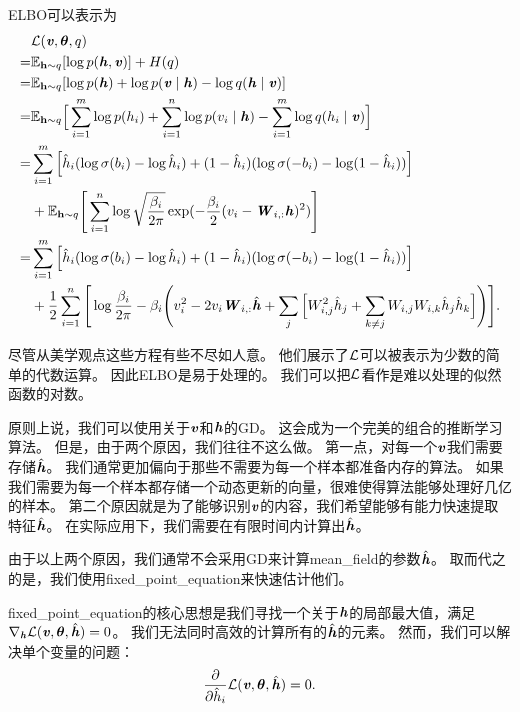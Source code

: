 \gls{ELBO}可以表示为
\begin{align}
\label{eqn:1936}
& \mathcal{L}(\boldsymbol{\mathit{v}},\boldsymbol{\theta},q)\\
 = & \mathbb{E}_{\mathbf{h}\sim q}[\log p(\boldsymbol{\mathit{h}},\boldsymbol{\mathit{v}})] + H(q)\\
 = & \mathbb{E}_{\mathbf{h}\sim q}[\log p(\boldsymbol{\mathit{h}}) + \log p(\boldsymbol{\mathit{v}}\mid\boldsymbol{\mathit{h}}) - \log q(\boldsymbol{\mathit{h}}\mid\boldsymbol{\mathit{v}})]\\
= & \mathbb{E}_{\mathbf{h}\sim q}\Big[\sum_{i=1}^{m}\log p(h_i) + \sum_{i=1}^{n} \log p(v_i\mid\boldsymbol{\mathit{h}}) - \sum_{i=1}^{m}\log q(h_i\mid\boldsymbol{\mathit{v}})\Big]\\
= &  \sum_{i=1}^{m}\Big[\hat{h}_i(\log \sigma(b_i) - \log \hat{h}_i) + (1 - \hat{h}_i)(\log \sigma(-b_i) - \log (1-\hat{h}_i))\Big] \\
& +  \mathbb{E}_{\mathbf{h}\sim q} \Bigg[ \sum_{i=1}^{n}\log \sqrt{\frac{\beta_i}{2\pi}}\exp(-\frac{\beta_i}{2}(v_i - \boldsymbol{\mathit{W}}_{i,:}\boldsymbol{\mathit{h}})^2)\Bigg] \\
= &  \sum_{i=1}^{m}\Big[\hat{h}_i(\log \sigma(b_i) - \log \hat{h}_i) + (1 - \hat{h}_i)(\log \sigma(-b_i) - \log (1-\hat{h}_i))\Big] \\
& + \frac{1}{2} \sum_{i=1}^{n} \Bigg[ \log {\frac{\beta_i}{2\pi}} - \beta_i \Bigg(v_i^2 - 2 v_i \boldsymbol{\mathit{W}}_{i,:}\hat{\boldsymbol{\mathit{h}}} + \sum_{j}\Big[W^2_{i,j}\hat{h}_j + \sum_{k \neq j}W_{i,j}W_{i,k}\hat{h}_j\hat{h}_k \Big] \Bigg) \Bigg]. 
\end{align}


尽管从美学观点这些方程有些不尽如人意。
他们展示了$\mathcal{L}$可以被表示为少数的简单的代数运算。
因此\gls{ELBO}是易于处理的。
我们可以把$\mathcal{L}$看作是难以处理的似然函数的对数。


原则上说，我们可以使用关于$\boldsymbol{\mathit{v}}$和$\boldsymbol{\mathit{h}}$的\gls{GD}。
这会成为一个完美的组合的推断学习算法。
但是，由于两个原因，我们往往不这么做。
第一点，对每一个$\boldsymbol{\mathit{v}}$我们需要存储$\hat{\boldsymbol{\mathit{h}}}$。
我们通常更加偏向于那些不需要为每一个样本都准备内存的算法。
如果我们需要为每一个样本都存储一个动态更新的向量，很难使得算法能够处理好几亿的样本。
第二个原因就是为了能够识别$\boldsymbol{\mathit{v}}$的内容，我们希望能够有能力快速提取特征$\hat{\boldsymbol{\mathit{h}}}$。
在实际应用下，我们需要在有限时间内计算出$\hat{\boldsymbol{\mathit{h}}}$。


由于以上两个原因，我们通常不会采用\gls{GD}来计算\gls{mean_field}的参数$\hat{\boldsymbol{\mathit{h}}}$。
取而代之的是，我们使用\gls{fixed_point_equation}来快速估计他们。


\gls{fixed_point_equation}的核心思想是我们寻找一个关于$\boldsymbol{\mathit{h}}$的局部最大值，满足$\nabla_{\boldsymbol{\mathit{h}}}\mathcal{L}(\boldsymbol{\mathit{v}},\boldsymbol{\theta},\hat{\boldsymbol{\mathit{h}}}) = 0$。
我们无法同时高效的计算所有的$\hat{\boldsymbol{\mathit{h}}}$的元素。
然而，我们可以解决单个变量的问题：
\begin{align}
\label{eqn:1937}
\frac{\partial}{\partial \hat{h}_i} \mathcal{L}(\boldsymbol{\mathit{v}},\boldsymbol{\theta},\hat{\boldsymbol{\mathit{h}}}) = 0 .
\end{align}


